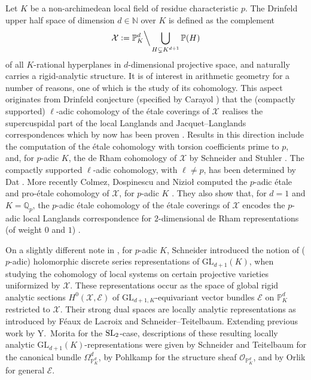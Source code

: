 \documentclass[a4paper, reqno, 10pt]{amsart}
\theoremstyle{definition}
\numberwithin{equation}{section}
\newcommand{\defeq}{\vcentcolon=}
\newcommand{\GL}{{\mathrm{GL}}}
\newcommand{\BN}{{\mathbb {N}}}
\newcommand{\BP}{{\mathbb {P}}}
\newcommand{\BQ}{{\mathbb {Q}}}
\newcommand{\CE}{{\mathcal {E}}}
\newcommand{\CO}{{\mathcal {O}}}
\newcommand{\CX}{{\mathcal {X}}}
\begin{document}
Let $K$ be a non-archimedean local field of residue characteristic $p$.
The Drinfeld upper half space of dimension $d\in \BN$ over $K$ is defined as the complement
\begin{equation*}
	\CX \defeq \BP_K^d \Big\backslash \bigcup_{H \subsetneq K^{d+1}} \BP(H) 
\end{equation*}
of all $K$-rational hyperplanes in $d$-dimensional projective space, and naturally carries a rigid-analytic structure.
It is of interest in arithmetic geometry for a number of reasons, one of which is the study of its cohomology.
This aspect originates from Drinfeld conjecture \cite{Drinfeld76CovpAdicSymReg} (specified by Carayol \cite{Carayol90NonAbLubinTateTh}) that the (compactly supported) $\ell$-adic cohomology of the \'etale coverings of $\CX$ realises the supercuspidal part of the local Langlands and Jacquet--Langlands correspondences which by now has been proven \cite{Faltings94TraceFormulaDrinfeld, Harris97SupercuspRepCohomDrinfeld, HarrisTaylor01GeomCohomSimpleShimuraVar}.
Results in this direction include the computation of the \'etale cohomology with torsion coefficients prime to $p$, and, for $p$-adic $K$, the de Rham cohomology of $\CX$ by Schneider and Stuhler \cite{SchneiderStuhler91CohompAdicSymSp}.
The compactly supported $\ell$-adic cohomology, with $\ell \neq p$, has been determined by Dat \cite{Dat06EspSymDrinfeldCorrespLanglandsLoc}.
More recently Colmez, Dospinescu and Nizio{\l} computed the $p$-adic \'etale and pro-\'etale cohomology of $\CX$, for $p$-adic $K$ \cite{ColmezDospinescuNiziol20CohompAdicSteinSp}.
They also show that, for $d=1$ and $K=\BQ_p$, the $p$-adic \'etale cohomology of the \'etale coverings of $\CX$ encodes the $p$-adic local Langlands correspondence for $2$-dimensional de Rham representations (of weight $0$ and $1$) \cite{ColmezDospinescuNiziol20CohompAdicTourDrinfeldCasDim1}.


On a slightly different note in \cite{Schneider92CohomLocSystemspAdicUnifVar}, for $p$-adic $K$, Schneider introduced the notion of ($p$-adic) holomorphic discrete series representations of $\GL_{d+1}(K)$, when studying the cohomology of local systems on certain projective varieties uniformized by $\CX$.
These representations occur as the space of global rigid analytic sections $H^0 (\CX,\CE)$ of $\GL_{d+1,K}$-equivariant vector bundles $\CE$ on $\BP_K^d$ restricted to $\CX$.
Their strong dual spaces are locally analytic representations as introduced by F\'eaux de Lacroix and Schneider--Teitelbaum.
Extending previous work by Y.\ Morita for the ${\rm SL}_2$-case, descriptions of these resulting locally analytic $\GL_{d+1}(K)$-representations were given by Schneider and Teitelbaum \cite{SchneiderTeitelbaum02pAdicBoundVal} for the canonical bundle $\Omega_{\BP_K^d}^d$, by Pohlkamp \cite{Pohlkamp02RandwerteHolomFunkt} for the structure sheaf $\CO_{\BP_K^d}$, and by Orlik \cite{Orlik08EquivVBDrinfeldUpHalfSp} for general $\CE$.
\\
\end{document}
